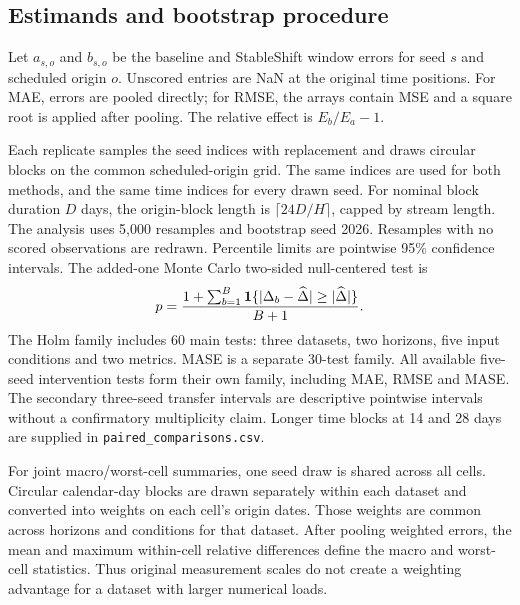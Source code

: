 \documentclass[11pt,a4paper]{article}
\begin{document}
\subsection{Estimands and bootstrap procedure}
Let $a_{s,o}$ and $b_{s,o}$ be the baseline and StableShift window errors for seed $s$ and scheduled origin $o$. Unscored entries are NaN at the original time positions. For MAE, errors are pooled directly; for RMSE, the arrays contain MSE and a square root is applied after pooling. The relative effect is $E_b/E_a-1$.

Each replicate samples the seed indices with replacement and draws circular blocks on the common scheduled-origin grid. The same indices are used for both methods, and the same time indices for every drawn seed. For nominal block duration $D$ days, the origin-block length is $\lceil24D/H\rceil$, capped by stream length. The analysis uses 5,000 resamples and bootstrap seed 2026. Resamples with no scored observations are redrawn. Percentile limits are pointwise 95\% confidence intervals. The added-one Monte Carlo two-sided null-centered test is
\begin{equation}
 p=\frac{1+\sum_{b=1}^{B}{\bf1}\{|\Delta_b-\widehat\Delta|\geq|\widehat\Delta|\}}{B+1}.
\end{equation}
The Holm family includes 60 main tests: three datasets, two horizons, five input conditions and two metrics. MASE is a separate 30-test family. All available five-seed intervention tests form their own family, including MAE, RMSE and MASE. The secondary three-seed transfer intervals are descriptive pointwise intervals without a confirmatory multiplicity claim. Longer time blocks at 14 and 28 days are supplied in \texttt{paired\_comparisons.csv}.

For joint macro/worst-cell summaries, one seed draw is shared across all cells. Circular calendar-day blocks are drawn separately within each dataset and converted into weights on each cell's origin dates. Those weights are common across horizons and conditions for that dataset. After pooling weighted errors, the mean and maximum within-cell relative differences define the macro and worst-cell statistics. Thus original measurement scales do not create a weighting advantage for a dataset with larger numerical loads.

\begin{table}[h]
\centering\caption{Chronological paired relative effects and pointwise 95\% intervals. Negative effects favor StableShift. The last column is the MAE Holm-adjusted $p$ value; RMSE adjusted tests are in Source Data.}\label{tab:primary}

\end{table}
\end{document}
